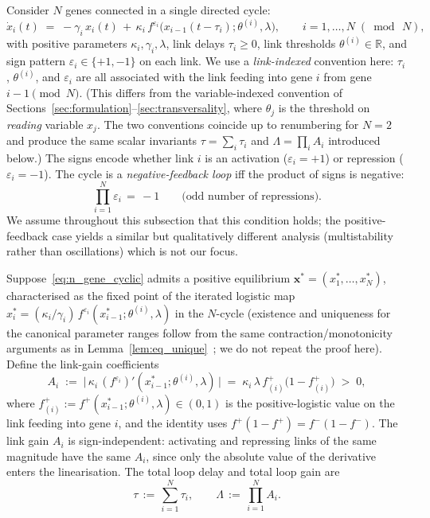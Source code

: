 \documentclass[sn-mathphys,Numbered]{sn-jnl}
\theoremstyle{thmstyleone}
\theoremstyle{thmstyletwo}
\theoremstyle{thmstylethree}
\begin{document}
Consider $N$ genes connected in a single directed cycle:
\begin{equation}
\dot{x}_i(t)
\;=\; -\gamma_i\,x_i(t)
       \,+\, \kappa_i\,
              f^{\varepsilon_i}\!\bigl(x_{i-1}(t-\tau_i);\theta^{(i)},\lambda\bigr),
\qquad i = 1,\ldots,N\;(\bmod\,N),
\label{eq:n_gene_cyclic}
\end{equation}
with positive parameters $\kappa_i,\gamma_i,\lambda$, link delays
$\tau_i\geq 0$, link thresholds $\theta^{(i)}\in\mathbb{R}$, and sign
pattern $\varepsilon_i\in\{+1,-1\}$ on each link. We use a
\emph{link-indexed} convention here: $\tau_i$, $\theta^{(i)}$, and
$\varepsilon_i$ are all associated with the link feeding into gene $i$
from gene $i-1\pmod N$. (This differs from the variable-indexed
convention of Sections~\ref{sec:formulation}--\ref{sec:transversality},
where $\theta_j$ is the threshold on \emph{reading} variable $x_j$. The
two conventions coincide up to renumbering for $N=2$ and produce the
same scalar invariants $\tau=\sum_i\tau_i$ and $\Lambda=\prod_i A_i$
introduced below.) The signs encode whether link $i$ is an activation
($\varepsilon_i=+1$) or repression ($\varepsilon_i=-1$). The cycle is
a \emph{negative-feedback loop} iff the product of signs is negative:
\[
\prod_{i=1}^N \varepsilon_i \,=\, -1
\qquad
\text{(odd number of repressions).}
\]
We assume throughout this subsection that this condition holds; the
positive-feedback case yields a similar but qualitatively different
analysis (multistability rather than oscillations) which is not our
focus.

Suppose~\eqref{eq:n_gene_cyclic} admits a positive equilibrium
$\mathbf{x}^* = (x_1^*,\ldots,x_N^*)$, characterised as the fixed point
of the iterated logistic map
$x_i^* = (\kappa_i/\gamma_i)\,f^{\varepsilon_i}(x_{i-1}^*;\theta^{(i)},\lambda)$
in the $N$-cycle (existence and uniqueness for the canonical parameter
ranges follow from the same contraction/monotonicity arguments as in
Lemma~\ref{lem:eq_unique}~\cite{belgacem2026logistic}; we do not repeat
the proof here). Define the link-gain coefficients
\begin{equation}
A_i \;:=\; \bigl|\,\kappa_i\,(f^{\varepsilon_i})'(x_{i-1}^*;\theta^{(i)},\lambda)\,\bigr|
\;=\; \kappa_i\,\lambda\,
       f^+_{(i)}\!\bigl(1-f^+_{(i)}\bigr)
\;>\;0,
\label{eq:Ai_def}
\end{equation}
where $f^+_{(i)} := f^+(x_{i-1}^*;\theta^{(i)},\lambda)\in(0,1)$ is the
positive-logistic value on the link feeding into gene $i$, and the
identity uses $f^+(1-f^+) = f^-(1-f^-)$. The link gain $A_i$ is
sign-independent: activating and repressing links of the same
magnitude have the same $A_i$, since only the absolute value of the
derivative enters the linearisation.
The total loop delay and total loop gain are
\begin{equation}
\tau \,:=\, \sum_{i=1}^N \tau_i,
\qquad
\Lambda \,:=\, \prod_{i=1}^N A_i.
\label{eq:total_loop}
\end{equation}
\end{document}
